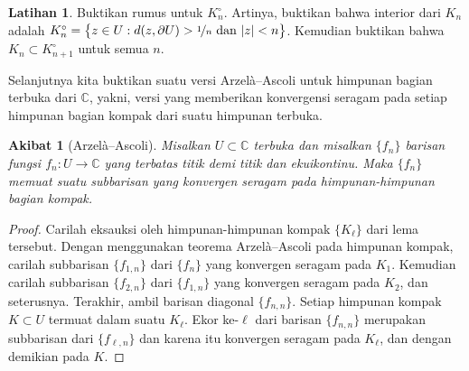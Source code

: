 \documentclass[12pt,openany]{book}
\newcommand{\sabs}[1]{\lvert {#1} \rvert}
\newcommand{\C}{{\mathbb{C}}}
\theoremstyle{plain}
\newtheorem{cor}[thm]{Akibat}
\theoremstyle{remark}
\theoremstyle{definition}
\newenvironment{exbox}{%
    \def\FrameCommand{\vrule width 1pt \relax\hspace{10pt}}%
    \MakeFramed{\advance\hsize-\width\FrameRestore}%
}{%
    \endMakeFramed
}
\theoremstyle{exercise}
\newtheorem{exercise}{Latihan}[section]
\theoremstyle{example}
\begin{document}
\begin{exbox}
\begin{exercise}
Buktikan rumus untuk $K^\circ_n$.  Artinya, buktikan bahwa interior
dari $K_n$ adalah
$K^\circ_n = \bigl\{
z \in U : d(z,\partial U) > \nicefrac{1}{n} \text{ dan } \sabs{z} < n
\bigr\}$.  Kemudian buktikan bahwa $K_n \subset K^\circ_{n+1}$ untuk semua $n$.
\end{exercise}
\end{exbox}

Selanjutnya kita buktikan suatu versi Arzel\`a--Ascoli untuk himpunan bagian terbuka dari $\C$,
yakni,
versi yang memberikan konvergensi seragam
pada setiap himpunan bagian kompak dari suatu himpunan terbuka.

\begin{cor}[Arzel\`a--Ascoli]
\label{cor:arzelaascoliplane}
Misalkan $U \subset \C$ terbuka dan misalkan $\{ f_n \}$
barisan fungsi $f_n \colon U \to \C$ yang terbatas titik demi titik dan ekuikontinu.
Maka
$\{ f_n \}$ memuat suatu subbarisan
yang konvergen seragam pada himpunan-himpunan bagian kompak.
\end{cor}

\begin{proof}
Carilah eksauksi oleh himpunan-himpunan kompak $\{ K_\ell \}$ dari lema tersebut.
Dengan menggunakan teorema Arzel\`a--Ascoli pada himpunan kompak,
carilah subbarisan $\{ f_{1,n} \}$ dari $\{f_n\}$ yang konvergen seragam
pada $K_1$.  Kemudian carilah subbarisan
$\{ f_{2,n} \}$ dari
$\{ f_{1,n} \}$ yang konvergen seragam pada $K_2$, dan seterusnya.
Terakhir, ambil barisan diagonal $\{ f_{n,n} \}$.
Setiap himpunan kompak $K \subset U$
termuat dalam suatu $K_\ell$.  Ekor ke-$\ell$ dari barisan $\{ f_{n,n}
\}$ merupakan subbarisan dari $\{ f_{\ell,n} \}$ dan karena itu konvergen seragam pada
$K_\ell$, dan dengan demikian pada $K$.
\end{proof}
\end{document}
